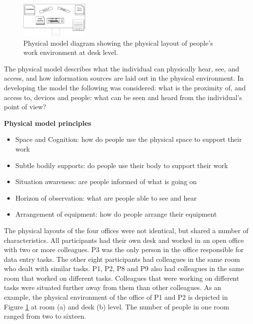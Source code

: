 \begin{figure}[!ht]
\centering
\includegraphics[width=0.3\textwidth]{images/ch12/ch12_physmoddesk.pdf}
\caption[Study 2 Desk model]{Physical model diagram showing the physical layout of people's work environment at desk level.}
\vspace{-9pt}
\label{fig:ch12_physmodroom}
\end{figure}

The physical model describes what the individual can physically hear, see, and access, and how information sources are laid out in the physical environment. In developing the model the following was considered: what is the proximity of, and access to, devices and people: what can be seen and heard from the individual's point of view?

\begin{framed}\noindent
\textbf{Physical model principles}

\begin{itemize}
\item Space and Cognition: how do people use the physical space to support their work
\item Subtle bodily supports: do people use their body to support their work
\item Situation awareness: are people informed of what is going on
\item Horizon of observation: what are people able to see and hear
\item Arrangement of equipment: how do people arrange their equipment
\end{itemize}

\end{framed}

The physical layouts of the four offices were not identical, but shared a number of characteristics. All participants had their own desk and worked in an open office with two or more colleagues. P3 was the only person in the office responsible for data entry tasks. The other eight participants had colleagues in the same room who dealt with similar tasks. P1, P2, P8 and P9 also had colleagues in the same room that worked on different tasks. Colleagues that were working on different tasks were situated further away from them than other colleagues. As an example, the physical environment of the office of P1 and P2 is depicted in Figure \ref{fig:ch12_physmodroom} at room (a) and desk (b) level. The number of people in one room ranged from two to sixteen. 

